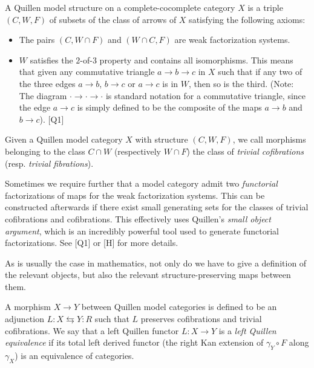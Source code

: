 \documentclass{amsart}
\begin{document}
\begin{defn}
A Quillen model structure on a complete-cocomplete category $X$ is a triple $(C,W,F)$ of subsets of the class of arrows of $X$ satisfying the following axioms:
\begin{itemize}
\item The pairs $(C,W\cap F)$ and $(W\cap C, F)$ are weak factorization systems. 
\item $W$ satisfies the $2$-of-$3$ property and contains all isomorphisms.  This means that given any commutative triangle $a\to b\to c$ in $X$ such that if any two of the three edges $a\to b$, $b\to c$ or $a\to c$ is in $W$, then so is the third. (Note: The diagram $\cdot\to \cdot\to \cdot$ is standard notation for a commutative triangle, since the edge $a\to c$ is simply defined to be the composite of the maps $a\to b$ and $b\to c$). [Q1]
\end{itemize}
\end{defn}

\begin{rmk}
Given a Quillen model category $X$ with structure $(C,W,F)$, we call morphisms belonging to the class $C\cap W$ (respectively $W \cap F$) the class of \emph{trivial cofibrations} (resp. \emph{trivial fibrations}).  
\end{rmk}

\begin{rmk}
Sometimes we require further that a model category admit two \emph{functorial} factorizations of maps for the weak factorization systems.  This can be constructed afterwards if there exist small generating sets for the classes of trivial cofibrations and cofibrations.  This effectively uses Quillen's \emph{small object argument}, which is an incredibly powerful tool used to generate functorial factorizations.  See [Q1] or [H] for more details.
\end{rmk}

As is usually the case in mathematics, not only do we have to give a definition of the relevant objects, but also the relevant structure-preserving maps between them.  

\begin{defn}
A morphism $X\to Y$ between Quillen model categories is defined to be an adjunction $L:X\leftrightarrows Y:R$ such that $L$ preserves cofibrations and trivial cofibrations.  We say that a left Quillen functor $L:X\to Y$ is a \emph{left Quillen equivalence} if its total left derived functor (the right Kan extension of $\gamma_Y \circ F$ along $\gamma_X$)  is an equivalence of categories.  
\end{defn}
\end{document}
